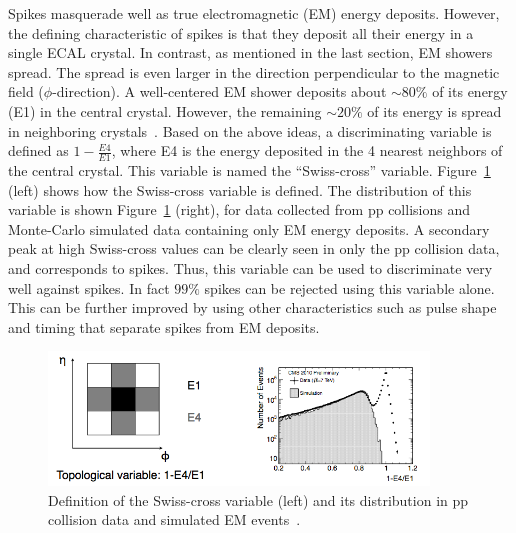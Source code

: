 Spikes masquerade well as true electromagnetic (EM) energy deposits. However, the defining characteristic of spikes is that they deposit all their energy in a single ECAL crystal. In contrast, as mentioned in the last section, EM showers spread. The spread is even larger in the direction perpendicular to the magnetic field ($\phi$-direction). A well-centered EM shower deposits about $\sim80\%$ of its energy (E1) in the central crystal. However, the remaining $\sim20\%$ of its energy is spread in neighboring crystals~\cite{petyt}. Based on the above ideas, a discriminating variable is defined as $1-\frac{E4}{E1}$, where E4 is the energy deposited in the 4 nearest neighbors of the central crystal. This variable is named the ``Swiss-cross'' variable. Figure~\ref{fig:swisscross} (left) shows how the Swiss-cross variable is defined. The distribution of this variable is shown Figure~\ref{fig:swisscross} (right), for data collected from pp collisions and Monte-Carlo simulated data containing only EM energy deposits. A secondary peak at high Swiss-cross values can be clearly seen in only the pp collision data, and corresponds to spikes. Thus, this variable can be used to discriminate very well against spikes. In fact $99\%$ spikes can be rejected using this variable alone. This can be further improved by using other characteristics such as pulse shape and timing that separate spikes from EM deposits.


\begin{figure}
  \begin{center}
    \captionsetup{width=.9\textwidth,justification=centering}
  \includegraphics[width=0.9\textwidth,keepaspectratio]{plots_and_figures/chapter3/swisscross.png}
\caption{Definition of the Swiss-cross variable (left) and its distribution in pp collision data and simulated EM events~\cite{petyt}.}
\label{fig:swisscross}
\end{center}
\end{figure}

